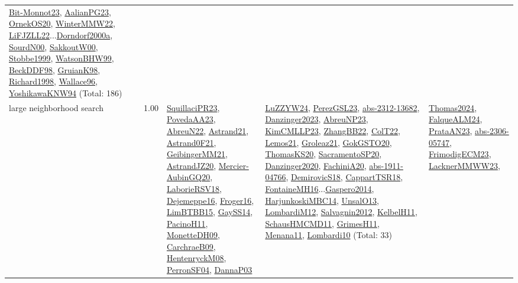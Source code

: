 {\begin{longtable}{p{3cm}r>{\raggedright\arraybackslash}p{6cm}>{\raggedright\arraybackslash}p{6cm}>{\raggedright\arraybackslash}p{8cm}}
\hyperref[detail:Bit-Monnot23]{Bit-Monnot23}, \hyperref[detail:AalianPG23]{AalianPG23}, \hyperref[detail:OrnekOS20]{OrnekOS20}, \hyperref[detail:WinterMMW22]{WinterMMW22}, \hyperref[detail:LiFJZLL22]{LiFJZLL22}...\hyperref[detail:Dorndorf2000a]{Dorndorf2000a}, \hyperref[detail:SourdN00]{SourdN00}, \hyperref[detail:SakkoutW00]{SakkoutW00}, \hyperref[detail:Stobbe1999]{Stobbe1999}, \hyperref[detail:WatsonBHW99]{WatsonBHW99}, \hyperref[detail:BeckDDF98]{BeckDDF98}, \hyperref[detail:GruianK98]{GruianK98}, \hyperref[detail:Richard1998]{Richard1998}, \hyperref[detail:Wallace96]{Wallace96}, \hyperref[detail:YoshikawaKNW94]{YoshikawaKNW94} (Total: 186)\\
\index{large neighborhood search}\index{Algorithms!large neighborhood search}large neighborhood search &  1.00 & \hyperref[detail:SquillaciPR23]{SquillaciPR23}, \hyperref[detail:PovedaAA23]{PovedaAA23}, \hyperref[detail:AbreuN22]{AbreuN22}, \hyperref[detail:Astrand21]{Astrand21}, \hyperref[detail:Astrand0F21]{Astrand0F21}, \hyperref[detail:GeibingerMM21]{GeibingerMM21}, \hyperref[detail:AstrandJZ20]{AstrandJZ20}, \hyperref[detail:Mercier-AubinGQ20]{Mercier-AubinGQ20}, \hyperref[detail:LaborieRSV18]{LaborieRSV18}, \hyperref[detail:Dejemeppe16]{Dejemeppe16}, \hyperref[detail:Froger16]{Froger16}, \hyperref[detail:LimBTBB15]{LimBTBB15}, \hyperref[detail:GaySS14]{GaySS14}, \hyperref[detail:PacinoH11]{PacinoH11}, \hyperref[detail:MonetteDH09]{MonetteDH09}, \hyperref[detail:CarchraeB09]{CarchraeB09}, \hyperref[detail:HentenryckM08]{HentenryckM08}, \hyperref[detail:PerronSF04]{PerronSF04}, \hyperref[detail:DannaP03]{DannaP03} & \hyperref[detail:LuZZYW24]{LuZZYW24}, \hyperref[detail:PerezGSL23]{PerezGSL23}, \hyperref[detail:abs-2312-13682]{abs-2312-13682}, \hyperref[detail:Danzinger2023]{Danzinger2023}, \hyperref[detail:AbreuNP23]{AbreuNP23}, \hyperref[detail:KimCMLLP23]{KimCMLLP23}, \hyperref[detail:ZhangBB22]{ZhangBB22}, \hyperref[detail:ColT22]{ColT22}, \hyperref[detail:Lemos21]{Lemos21}, \hyperref[detail:Groleaz21]{Groleaz21}, \hyperref[detail:GokGSTO20]{GokGSTO20}, \hyperref[detail:ThomasKS20]{ThomasKS20}, \hyperref[detail:SacramentoSP20]{SacramentoSP20}, \hyperref[detail:Danzinger2020]{Danzinger2020}, \hyperref[detail:FachiniA20]{FachiniA20}, \hyperref[detail:abs-1911-04766]{abs-1911-04766}, \hyperref[detail:DemirovicS18]{DemirovicS18}, \hyperref[detail:CappartTSR18]{CappartTSR18}, \hyperref[detail:FontaineMH16]{FontaineMH16}...\hyperref[detail:Gaspero2014]{Gaspero2014}, \hyperref[detail:HarjunkoskiMBC14]{HarjunkoskiMBC14}, \hyperref[detail:UnsalO13]{UnsalO13}, \hyperref[detail:LombardiM12]{LombardiM12}, \hyperref[detail:Salvagnin2012]{Salvagnin2012}, \hyperref[detail:KelbelH11]{KelbelH11}, \hyperref[detail:SchausHMCMD11]{SchausHMCMD11}, \hyperref[detail:GrimesH11]{GrimesH11}, \hyperref[detail:Menana11]{Menana11}, \hyperref[detail:Lombardi10]{Lombardi10} (Total: 33) & \hyperref[detail:Thomas2024]{Thomas2024}, \hyperref[detail:FalqueALM24]{FalqueALM24}, \hyperref[detail:PrataAN23]{PrataAN23}, \hyperref[detail:abs-2306-05747]{abs-2306-05747}, \hyperref[detail:FrimodigECM23]{FrimodigECM23}, \hyperref[detail:LacknerMMWW23]{LacknerMMWW23}, 
\end{longtable}}

